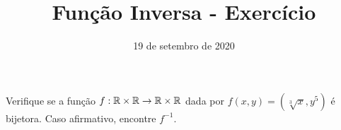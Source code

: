 \documentclass{beamer}
\title{Fun\c{c}\~ao Inversa - Exercício}
\author[\autor]{\autor}
\institute[\instituto]{\instituto}
\date{19 de setembro de 2020}
\begin{document}
    \begin{frame}
        \maketitle
    \end{frame}


    \begin{frame}
        \begin{exercicio}
            Verifique se a fun\c{c}\~ao $f : \mathbb{R} \times \mathbb{R} \to \mathbb{R} \times \mathbb{R}$ dada por $f(x,y) = (\sqrt[3]{x}, y^5)$ \'e bijetora. Caso afirmativo, encontre $f^{-1}$.
        \end{exercicio}

        \vspace{6cm}
    \end{frame}

    \begin{frame}
        
    \end{frame}

    \begin{frame}
        
    \end{frame}

    \begin{frame}
        
    \end{frame}
\end{document}
